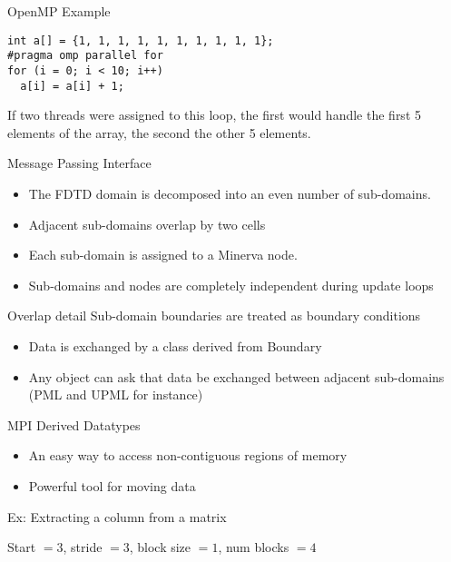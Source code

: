 \documentclass[pdf, nototal, slideBW]{prosper}
\newcommand{\insgraphic}[2]{
  \begin{center}
    \scalebox{#1}{
      \texttt{[image: \#2]}
    }
  \end{center}
}
\begin{document}
\begin{slide}{OpenMP Example}
\begin{verbatim}
int a[] = {1, 1, 1, 1, 1, 1, 1, 1, 1, 1};
#pragma omp parallel for
for (i = 0; i < 10; i++)
  a[i] = a[i] + 1;  
\end{verbatim}
  If two threads were assigned to this loop, the first would handle
  the first 5 elements of the array, the second the other 5 elements. 
\end{slide}

\begin{slide}{Message Passing Interface}

  \begin{itemize}
  \item The FDTD domain is decomposed into an even number of
    sub-domains.
  \item Adjacent sub-domains overlap by two cells
  \item Each sub-domain is assigned to a Minerva node.
  \item Sub-domains and nodes are completely independent during update loops
  \end{itemize}

  \insgraphic{0.5}{domain-decomp.eps}
  
\end{slide}

\begin{slide}{Overlap detail}
  Sub-domain boundaries are treated as boundary conditions
  \begin{itemize}
  \item Data is exchanged by a class derived from Boundary
  \item Any object can ask that data be exchanged between adjacent
    sub-domains (PML and UPML for instance)
  \end{itemize}

  \insgraphic{0.75}{overlap.eps}
\end{slide}

\begin{slide}{MPI Derived Datatypes}  
  \begin{itemize}
    \item An easy way to access non-contiguous regions of memory
    \item Powerful tool for moving data
  \end{itemize}

  Ex: Extracting a column from a matrix
  \insgraphic{0.75}{mpi-datatypes.eps}
  Start $= 3$, stride $= 3$, block size $=1$, num blocks $= 4$
\end{slide}
\end{document}
